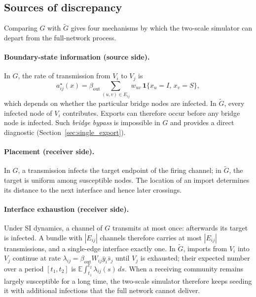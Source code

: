 \documentclass[a4paper,fleqn]{cas-sc}
\newcommand{\ibar}{\bar{y}}
\newcommand{\sbar}{\bar{s}}
\newcommand{\ind}{\mathbf{1}}
\begin{document}
\subsection{Sources of discrepancy}
\label{sec:sources}

Comparing $G$ with $\tilde G$ gives four mechanisms by which the two-scale simulator can depart from the full-network process.

\paragraph{Boundary-state information (source side).}
In $G$, the rate of transmission from $V_i$ to $V_j$ is
\begin{equation}
\label{eq:exact_rate}
a^\star_{ij}(x)=\beta_{\mathrm{out}}\sum_{(u,v)\in E_{ij}}w_{uv}\,\ind\{x_u=I,\,x_v=S\},
\end{equation}
which depends on whether the particular bridge nodes are infected. In $\tilde G$, every infected node of $V_i$ contributes. Exports can therefore occur before any bridge node is infected. Such \emph{bridge bypass} is impossible in $G$ and provides a direct diagnostic (Section~\ref{sec:single_export}).

\paragraph{Placement (receiver side).}
In $G$, a transmission infects the target endpoint of the firing channel; in $\tilde G$, the target is uniform among susceptible nodes. The location of an import determines its distance to the next interface and hence later crossings.

\paragraph{Interface exhaustion (receiver side).}
Under SI dynamics, a channel of $G$ transmits at most once: afterwards its target is infected. A bundle with $|E_{ij}|$ channels therefore carries at most $|E_{ij}|$ transmissions, and a single-edge interface exactly one. In $\tilde G$, imports from $V_i$ into $V_j$ continue at rate $\lambda_{ij}=\beta_{\mathrm{out}}W_{ij}\ibar_i\sbar_j$ until $V_j$ is exhausted; their expected number over a period $[t_1,t_2]$ is $\mathbb{E}\int_{t_1}^{t_2}\lambda_{ij}(s)\,ds$. When a receiving community remains largely susceptible for a long time, the two-scale simulator therefore keeps seeding it with additional infections that the full network cannot deliver.
\end{document}
